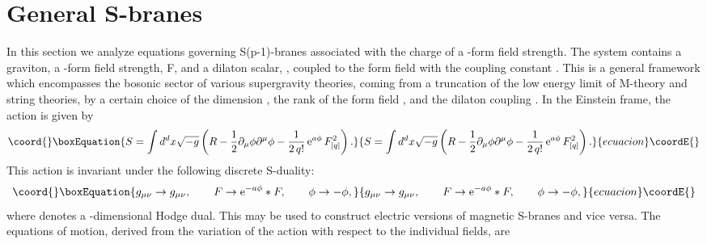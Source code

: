\documentclass[a4paper,aps,nofootinbib,showpacs,preprint]{revtex4}
\begin{document}
\section{General S-branes}
In this section we analyze equations governing S(p-1)-branes
associated with the charge of a \coordHE{}-form field strength. The
system contains a graviton, a \coordHE{}-form field strength, F\myHighlight{$_{[q]}$}\coordHE{},
and a dilaton scalar, \myHighlight{$\phi$}\coordHE{}, coupled to the form field with the
coupling constant \coordHE{}. This is a general framework which
encompasses the bosonic sector of various supergravity theories,
coming from a truncation of the low energy limit of M-theory and
string theories, by a certain choice of the dimension \coordHE{}, the
rank of the form field \coordHE{}, and the dilaton coupling \coordHE{}. In the
Einstein frame, the action is given by
\begin{equation}\coord{}\boxEquation{\label{action}
S = \int d^d x \sqrt{-g} \left( R - \frac12 \partial_\mu \phi
\partial^\mu \phi - \frac1{2\, q!} \, {\rm e}^{a\phi} \, F_{[q]}^2
\right).
}{S = \int d^d x \sqrt{-g} \left( R - \frac12 \partial_\mu \phi
\partial^\mu \phi - \frac1{2\, q!} \, {\rm e}^{a\phi} \, F_{[q]}^2
\right).
}{ecuacion}\coordE{}\end{equation}
This action is invariant under the following discrete S-duality:
\begin{equation}\coord{}\boxEquation{ \label{duality}
g_{\mu\nu} \to g_{\mu\nu}, \qquad F \to {\rm e}^{-a\phi} \ast F,
\qquad \phi \to -\phi,
}{ g_{\mu\nu} \to g_{\mu\nu}, \qquad F \to {\rm e}^{-a\phi} \ast F,
\qquad \phi \to -\phi,
}{ecuacion}\coordE{}\end{equation}
where \myHighlight{$\ast$}\coordHE{} denotes a \coordHE{}-dimensional Hodge dual. This may be
used to construct electric versions of magnetic S-branes and vice
versa. The equations of motion, derived from the variation of the
action with respect to the individual fields, are
\end{document}
